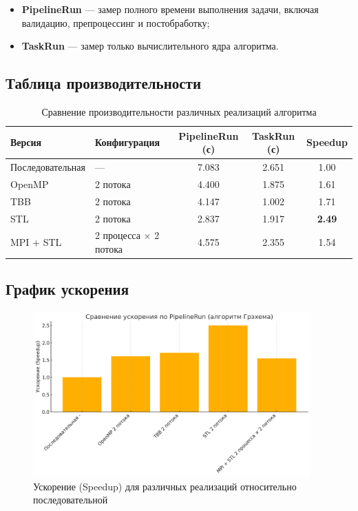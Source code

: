 \documentclass[12pt,a4paper]{extarticle}
\begin{document}
\begin{itemize}
    \item \textbf{PipelineRun} — замер полного времени выполнения задачи, включая валидацию, препроцессинг и постобработку;
    \item \textbf{TaskRun} — замер только вычислительного ядра алгоритма.
\end{itemize}

\subsection{Таблица производительности}

\renewcommand{\arraystretch}{1.3}
\begin{table}[H]
\centering
\footnotesize
\begin{tabularx}{\textwidth}{|l|l|c|c|c|}
\hline
\textbf{Версия} & \textbf{Конфигурация} & \textbf{PipelineRun (с)} & \textbf{TaskRun (с)} & \textbf{Speedup} \\
\hline
Последовательная & — & 7.083 & 2.651 & 1.00 \\
OpenMP           & 2 потока & 4.400 & 1.875 & 1.61 \\
TBB              & 2 потока & 4.147 & 1.002 & 1.71 \\
STL              & 2 потока & 2.837 & 1.917 & \textbf{2.49} \\
MPI + STL        & 2 процесса × 2 потока & 4.575 & 2.355 & 1.54 \\
\hline
\end{tabularx}
\caption{Сравнение производительности различных реализаций алгоритма}
\end{table}

\subsection{График ускорения}

\begin{figure}[H]
\centering
\includegraphics[width=0.95\textwidth]{speedup_chart.png}
\caption{Ускорение (Speedup) для различных реализаций относительно последовательной}
\end{figure}
\end{document}
